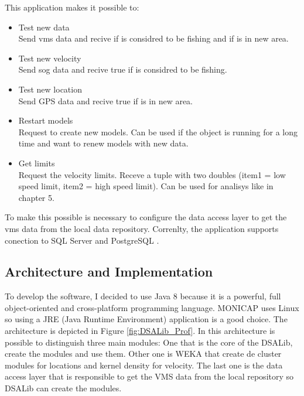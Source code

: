 This application makes it possible to:
\begin{itemize}
\item Test new data \\ Send vms data and recive if is considred to be fishing and if is in new area.
\item Test new velocity \\ Send sog data and recive true if is considred to be fishing.
\item Test new location \\ Send GPS data and recive true if is in new area.
\item Restart models \\ Request to create new models. Can be used if the object is running for a long time and want to renew models with new data. 
\item Get limits \\ Request the velocity limits. Receve a tuple with two doubles (item1 = low speed limit, item2 = high speed limit). Can be used for analisys like in chapter 5.
\end{itemize}

To make this possible is necessary to configure the data access layer to get the vms data from the local data repository.
Correnlty, the application supports conection to SQL Server \cite{WEBSITE:SqlServer} and PostgreSQL \cite{WEBSITE:Postgresql}.




\subsection{Architecture and Implementation} %
\label{sub:architecturee_implementation}
To develop the software, I decided to use Java 8 \cite{WEBSITE:OraJava8} because it is a powerful, full object-oriented and cross-platform programming language. MONICAP uses Linux so using a JRE (Java Runtime Environment) application is a good choice.
The architecture is depicted in Figure \ref{fig:DSALib_Prof}. In this architecture is possible to distinguish three main modules: One that is the core of the DSALib, create the modules and use them. Other one is WEKA \cite{WEBSITE:Weka} that create de cluster modules for locations and kernel density for velocity. The last one is the data access layer that is responsible to get the VMS data from the local repository so DSALib can create the modules.


